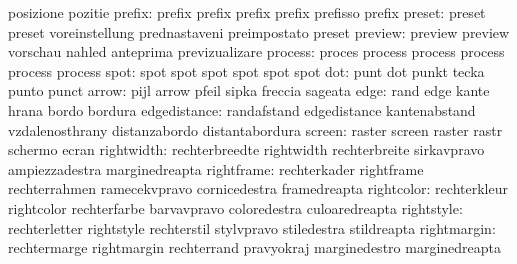                            posizione                 pozitie %
                   prefix: prefix                    prefix
                           prefix                    prefix
                           prefisso                  prefix
                   preset: preset                    preset
                           voreinstellung            prednastaveni
                           preimpostato              preset %
                  preview: preview                   preview
                           vorschau                  nahled
                           anteprima                 previzualizare
process: proces   process
         process  process
         process  process
   spot: spot spot
         spot spot
         spot spot
                      dot: punt                      dot
                           punkt                     tecka
                           punto                     punct
                    arrow: pijl                      arrow
                           pfeil                     sipka
                           freccia                   sageata
                     edge: rand                      edge
                           kante                     hrana
                           bordo                     bordura
             edgedistance: randafstand               edgedistance
                           kantenabstand             vzdalenosthrany
                           distanzabordo             distantabordura
                   screen: raster                    screen
                           raster                    rastr
                           schermo                   ecran
               rightwidth: rechterbreedte            rightwidth
                           rechterbreite             sirkavpravo
                           ampiezzadestra            marginedreapta
               rightframe: rechterkader              rightframe
                           rechterrahmen             ramecekvpravo
                           cornicedestra             framedreapta
               rightcolor: rechterkleur              rightcolor
                           rechterfarbe              barvavpravo
                           coloredestra              culoaredreapta
               rightstyle: rechterletter             rightstyle
                           rechterstil               stylvpravo
                           stiledestra               stildreapta
              rightmargin: rechtermarge              rightmargin
                           rechterrand               pravyokraj
                           marginedestro             marginedreapta
